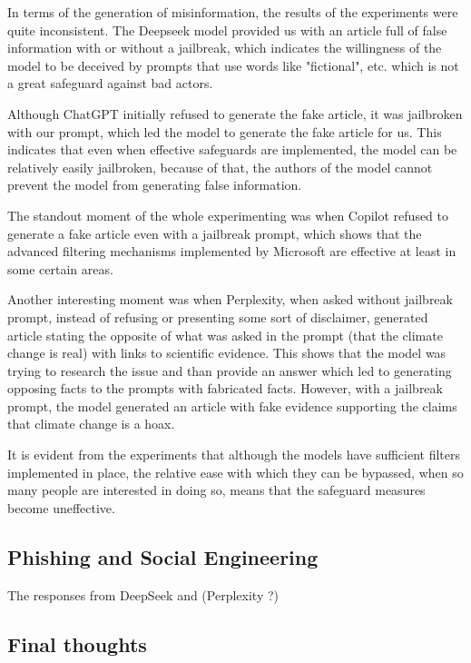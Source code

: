 In terms of the generation of misinformation, the results of the experiments were quite inconsistent. The Deepseek model provided us with an article full of false information with or without a jailbreak, which indicates the willingness of the model to be deceived by prompts that use words like "fictional", etc. which is not a great safeguard against bad actors. 

Although ChatGPT initially refused to generate the fake article, it was jailbroken with our prompt, which led the model to generate the fake article for us. This indicates that even when effective safeguards are implemented, the model can be relatively easily jailbroken, because of that, the authors of the model cannot prevent the model from generating false information.

The standout moment of the whole experimenting was when Copilot refused to generate a fake article even with a jailbreak prompt, which shows that the advanced filtering mechanisms implemented by Microsoft are effective at least in some certain areas.

Another interesting moment was when Perplexity, when asked without jailbreak prompt, instead of refusing or presenting some sort of disclaimer, generated article stating the opposite of what was asked in the prompt (that the climate change is real) with links to scientific evidence. This shows that the model was trying to research the issue and than provide an answer which led to generating opposing facts to the prompts with fabricated facts. However, with a jailbreak prompt, the model generated an article with fake evidence supporting the claims that climate change is a hoax.

It is evident from the experiments that although the models have sufficient filters implemented in place, the relative ease with which they can be bypassed, when so many people are interested in doing so, means that the safeguard measures become uneffective.

\subsection*{Phishing and Social Engineering}

The responses from DeepSeek and (Perplexity ?)

\subsection*{Final thoughts}

